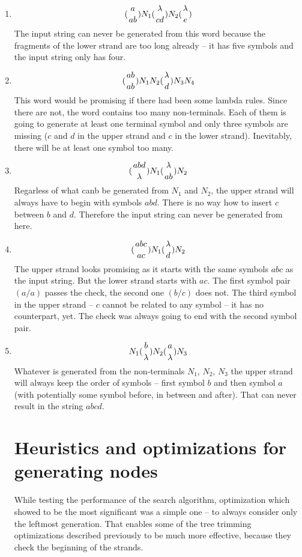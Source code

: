 \begin{enumerate}
\item{
$$({a \atop ab}) N_1 ({\lambda \atop cd}) N_2 ({\lambda \atop e})$$
The input string can never be generated from this word because the fragments of the lower strand are too long already -- it has five symbols and the input string only has four.
}
\item{
$$({ab \atop ab}) N_1 N_2 ({\lambda \atop d}) N_3 N_4$$
This word would be promising if there had been some lambda rules. Since there are not, the word contains too many non-terminals. Each of them is going to generate at least one terminal symbol and only three symbols are missing ($c$ and $d$ in the upper strand and $c$ in the lower strand). Inevitably, there will be at least one symbol too many.
}
\item{
$$({abd \atop \lambda}) N_1 ({\lambda \atop ab}) N_2$$
Regarless of what canb be generated from $N_1$ and $N_2$, the upper strand will always have to begin with symbols $abd$. There is no way how to insert $c$ between $b$ and $d$. Therefore the input string can never be generated from here.
}
\item{
$$({abc \atop ac}) N_1 ({\lambda \atop d}) N_2$$
The upper strand looks promising as it starts with the same symbols $abc$ as the input string. But the lower strand starts with $ac$. The first symbol pair $(a/a)$ passes the check, the second one $(b/c)$ does not. The third symbol in the upper strand -- $c$ cannot be related to any symbol -- it has no counterpart, yet. The check was always going to end with the second symbol pair.
}
\item{
$$N_1 ({b \atop \lambda}) N_2 ({a \atop \lambda}) N_3$$
Whatever is generated from the non-terminals $N_1$, $N_2$, $N_3$ the upper strand will always keep the order of symbols -- first symbol $b$ and then symbol $a$ (with potentially some symbol before, in between and after). That can never result in the string $abcd$.
}

\section{Heuristics and optimizations for generating nodes}
While testing the performance of the search algorithm, optimization which showed to be the most significant was a simple one -- to always consider only the leftmost generation. That enables some of the tree trimming optimizations described previously to be much more effective, because they check the beginning of the strands.


\end{enumerate}
